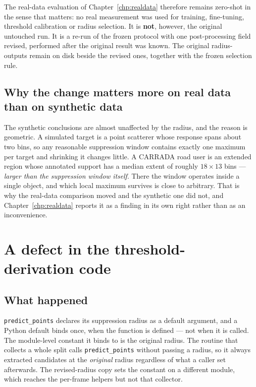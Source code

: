 The real-data evaluation of Chapter~\ref{chp:realdata} therefore remains zero-shot in the sense that
matters: no real measurement was used for training, fine-tuning, threshold calibration or radius
selection. It is \textbf{not}, however, the original untouched run. It is a re-run of the frozen
protocol with one post-processing field revised, performed after the original result was known. The
original radius-\ProtocolNmsOriginal{} outputs remain on disk beside the revised ones, together with
the frozen selection rule.

\subsection*{Why the change matters more on real data than on synthetic data}

The synthetic conclusions are almost unaffected by the radius, and the reason is geometric. A
simulated target is a point scatterer whose response spans about two bins, so any reasonable
suppression window contains exactly one maximum per target and shrinking it changes little. A CARRADA
road user is an extended region whose annotated support has a median extent of roughly
$18 \times 13$ bins --- \emph{larger than the suppression window itself}. There the window operates
inside a single object, and which local maximum survives is close to arbitrary. That is why the
real-data comparison moved and the synthetic one did not, and Chapter~\ref{chp:realdata} reports it
as a finding in its own right rather than as an inconvenience.

\section{A defect in the threshold-derivation code}
\label{app:thrdefect}

\subsection*{What happened}

\texttt{predict\_points} declares its suppression radius as a default argument, and a Python default
binds once, when the function is defined --- not when it is called. The module-level constant it
binds to is the original radius. The routine that collects a whole split calls
\texttt{predict\_points} without passing a radius, so it always extracted candidates at the
\emph{original} radius regardless of what a caller set afterwards. The revised-radius copy sets the
constant on a different module, which reaches the per-frame helpers but not that collector.

